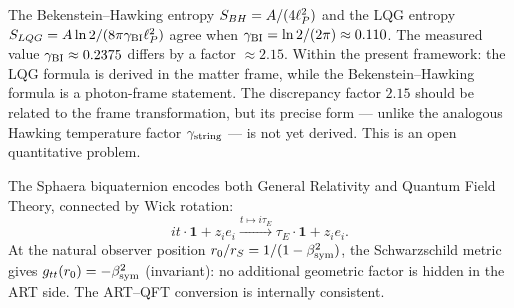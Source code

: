 \begin{remark}
The Bekenstein--Hawking entropy $S_{BH}=A/(4\ell_P^2)$ and the LQG entropy
$S_{LQG}=A\ln 2/(8\pi\gamma_{\mathrm{BI}}\ell_P^2)$ agree when $\gamma_{\mathrm{BI}}=\ln 2/(2\pi)\approx 0.110$.
The measured value $\gamma_{\mathrm{BI}}\approx 0.2375$ differs by a factor $\approx 2.15$.
Within the present framework: the LQG formula is derived in the matter
frame, while the Bekenstein--Hawking formula is a photon-frame statement.
The discrepancy factor $2.15$ should be related to the frame
transformation, but its precise form --- unlike the analogous Hawking
temperature factor $\gamma_{\mathrm{string}}$ --- is not yet derived.
This is an open quantitative problem.
\end{remark}

\begin{theorem}\label{thm:artqft}
The Sphaera biquaternion encodes both General Relativity and Quantum
Field Theory, connected by Wick rotation:
\[
  it\cdot\mathbf{1} + z_i e_i
  \xrightarrow{t\mapsto i\tau_E}
  \tau_E\cdot\mathbf{1} + z_i e_i.
\]
At the natural observer position $r_0/r_S = 1/(1-\beta_{\mathrm{sym}}^2)$, the
Schwarzschild metric gives $g_{tt}(r_0)=-\beta_{\mathrm{sym}}^2$ (invariant): no
additional geometric factor is hidden in the ART side.
The ART--QFT conversion is internally consistent.
\end{theorem}


